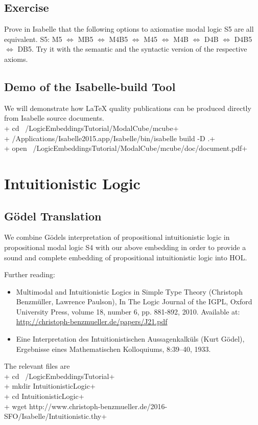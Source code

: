 \documentclass{article}
\begin{document}
\subsection{Exercise}
Prove in Isabelle that the following options to axiomatise modal logic
S5 are all equivalent.  S5: M5 $\Leftrightarrow$ MB5 $\Leftrightarrow$
M4B5 $\Leftrightarrow$ M45 $\Leftrightarrow$ M4B $\Leftrightarrow$ D4B
$\Leftrightarrow$ D4B5 $\Leftrightarrow$ DB5. Try it with the semantic
and the syntactic version of the respective axioms.



\subsection{Demo of the Isabelle-build Tool}
We will demonstrate how LaTeX quality
publications can be produced directly from Isabelle source documents. \\[1em]
+ cd ~/LogicEmbeddingsTutorial/ModalCube/mcube+\\
+ /Applications/Isabelle2015.app/Isabelle/bin/isabelle build -D .+ \\
+ open ~/LogicEmbeddingsTutorial/ModalCube/mcube/doc/document.pdf+
\\[1em]


\section{Intuitionistic Logic}

\subsection{G\"odel Translation}
We combine G\"odels interpretation of propositional
intuitionistic logic in propositional modal logic S4 with our above
embedding in order to provide a sound and complete embedding of propositional intuitionistic logic into HOL.

Further reading:
\begin{itemize}
\item Multimodal and Intuitionistic Logics in Simple Type Theory
  (Christoph Benzm\"uller, Lawrence Paulson), In The Logic Journal of
  the IGPL, Oxford University Press, volume 18, number 6, pp. 881-892,
  2010. Available at:
  \href{http://christoph-benzmueller.de/papers/J21.pdf}{http://christoph-benzmueller.de/papers/J21.pdf}
\item Eine Interpretation des Intuitionistischen Aussagenkalk\"uls (Kurt G\"odel),  Ergebnisse eines Mathematischen Kolloquiums, 8:39–40, 1933.
\end{itemize}
The relevant files are \\[1em]
+ cd ~/LogicEmbeddingsTutorial+\\
+ mkdir IntuitionisticLogic+ \\
+ cd IntuitionisticLogic+ \\
+ wget http://www.christoph-benzmueller.de/2016-SFO/Isabelle/Intuitionistic.thy+
\\
\end{document}

